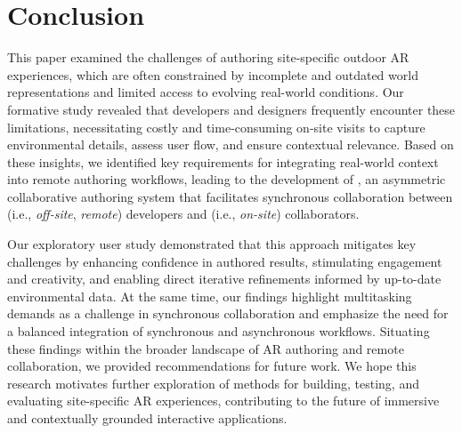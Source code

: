 \section{Conclusion}
This paper examined the challenges of authoring site-specific outdoor AR experiences, which are often constrained by incomplete and outdated world representations and limited access to evolving real-world conditions. Our formative study revealed that developers and designers frequently encounter these limitations, necessitating costly and time-consuming on-site visits to capture environmental details, assess user flow, and ensure contextual relevance. Based on these insights, we identified key requirements for integrating real-world context into remote authoring workflows, leading to the development of \SystemName, an asymmetric collaborative authoring system that facilitates synchronous collaboration between \exsitu (i.e., \textit{off-site}, \textit{remote}) developers and \insitu (i.e., \textit{on-site}) collaborators.

Our exploratory user study demonstrated that this approach mitigates key challenges by enhancing confidence in authored results, stimulating engagement and creativity, and enabling direct iterative refinements informed by up-to-date environmental data. At the same time, our findings highlight multitasking demands as a challenge in synchronous collaboration and emphasize the need for a balanced integration of synchronous and asynchronous workflows. Situating these findings within the broader landscape of AR authoring and remote collaboration, we provided recommendations for future work. We hope this research motivates further exploration of methods for building, testing, and evaluating site-specific AR experiences, contributing to the future of immersive and contextually grounded interactive applications.
